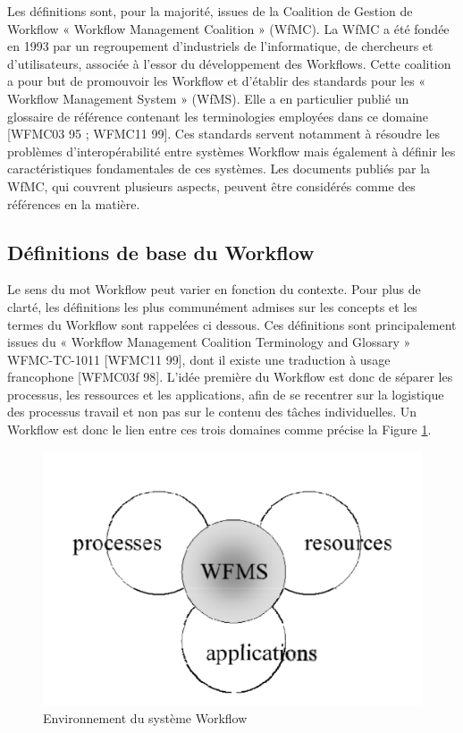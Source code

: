  	 Les définitions sont, pour la majorité, issues de la Coalition de Gestion de Workflow « Workflow Management Coalition » (WfMC). La WfMC a été fondée en 1993 par un regroupement d’industriels de l’informatique, de chercheurs et d’utilisateurs, associée à l’essor du développement des Workflows. Cette coalition a pour but de promouvoir les Workflow et d’établir des standards pour les « Workflow Management System » (WfMS). Elle a en particulier publié un glossaire de référence contenant les terminologies employées dans ce domaine [WFMC03 95 ; WFMC11 99]. Ces standards servent notamment à résoudre les problèmes d’interopérabilité entre systèmes Workflow mais également à définir les caractéristiques fondamentales de ces systèmes. Les documents publiés par la WfMC, qui couvrent plusieurs aspects, peuvent être considérés comme des références en la matière. 
 	
 	\subsection{Définitions de base du Workflow } 
 	 
 	 Le sens du mot Workflow peut varier en fonction du contexte. Pour plus de clarté, les définitions les plus communément admises sur les concepts et les termes du Workflow sont rappelées ci dessous. Ces définitions sont principalement issues du « Workflow Management Coalition Terminology and Glossary » WFMC-TC-1011 [WFMC11 99], dont il existe une traduction à usage francophone [WFMC03f 98]. L’idée première du Workflow est donc de séparer les processus, les ressources et les applications, afin de se recentrer sur la logistique des processus travail et non pas sur le contenu des tâches individuelles. Un Workflow est donc le lien entre ces trois domaines comme précise la Figure \ref{fig:environnementswf}. 
 	 
 	 
 	 
 	 
 	 
 	 
 	 
\begin{figure}[H]
	\centering
	\includegraphics[width=0.6\linewidth]{images/Environnementswf}
	\caption{ Environnement du système Workflow}
	\label{fig:environnementswf}
\end{figure}
 	 
